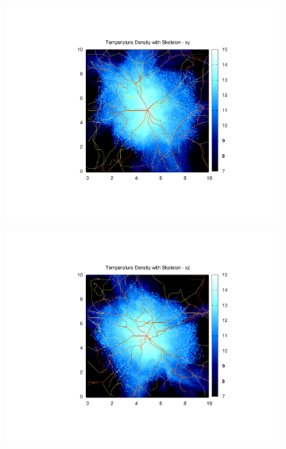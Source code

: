 \documentclass[journal]{IEEEtran}
\begin{document}
\begin{figure}[t!]
\begin{subfigure}[t]{0.3\textwidth}
		\includegraphics[width=\linewidth]{TempDenSkelxy}
	\end{subfigure}
	\quad
	\begin{subfigure}[t]{0.3\textwidth}
		\centering
		\includegraphics[width=\linewidth]{TempDenSkelxz}
	\end{subfigure}
	\quad
	\begin{subfigure}[t]{0.3\textwidth}
		\centering

\end{subfigure}
\end{figure}
\end{document}
